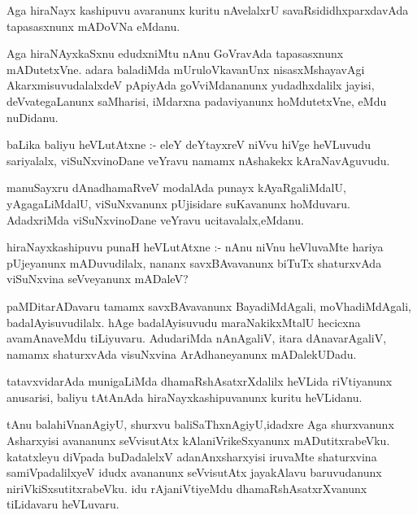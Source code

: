 \documentclass{article}
\begin{document}
\begin{mn}
Aga hiraNayx kashipuvu avaranunx kuritu nAvelalxrU savaRsididhxparxdavAda 
tapasasxnunx mADoVNa eMdanu.
\end{mn}

\begin{mn}
Aga hiraNAyxkaSxnu edudxniMtu nAnu GoVravAda tapasasxnunx mADutetxVne.
adara baladiMda mUruloVkavanUnx nisasxMshayavAgi AkarxmisuvudalalxdeV 
pApiyAda goVviMdananunx yudadhxdalilx jayisi, deVvategaLanunx saMharisi, 
iMdarxna padaviyanunx hoMdutetxVne, eMdu nuDidanu.
\end{mn}

\begin{mn}
baLika baliyu heVLutAtxne :- eleY deYtayxreV niVvu hiVge heVLuvudu sariyalalx,
 viSuNxvinoDane veYravu namamx nAshakekx kAraNavAguvudu.
\end{mn}

\begin{mn}
manuSayxru dAnadhamaRveV modalAda punayx kAyaRgaliMdalU, yAgagaLiMdalU, 
viSuNxvanunx pUjisidare suKavanunx hoMduvaru. AdadxriMda viSuNxvinoDane 
veYravu ucitavalalx,eMdanu. 
\end{mn}

\begin{mn}
hiraNayxkashipuvu punaH heVLutAtxne :- nAnu niVnu heVluvaMte hariya pUjeyanunx 
mADuvudilalx, nananx savxBAvavanunx biTuTx shaturxvAda viSuNxvina seVveyanunx mADaleV?
\end{mn}

\begin{mn}
paMDitarADavaru tamamx savxBAvavanunx BayadiMdAgali, moVhadiMdAgali, 
badalAyisuvudilalx. hAge badalAyisuvudu maraNakikxMtalU hecicxna avamAnaveMdu 
tiLiyuvaru. AdudariMda nAnAgaliV, itara dAnavarAgaliV, namamx shaturxvAda 
visuNxvina ArAdhaneyanunx mADalekUDadu.
\end{mn}

\begin{mn}
tatavxvidarAda munigaLiMda dhamaRshAsatxrXdalilx heVLida riVtiyanunx 
anusarisi, baliyu tAtAnAda hiraNayxkashipuvanunx kuritu heVLidanu. 
\end{mn}

\begin{mn}
tAnu balahiVnanAgiyU, shurxvu baliSaThxnAgiyU,idadxre Aga shurxvanunx 
Asharxyisi avananunx seVvisutAtx kAlaniVrikeSxyanunx mADutitxrabeVku. 
katatxleyu diVpada buDadalelxV adanAnxsharxyisi iruvaMte shaturxvina 
samiVpadalilxyeV idudx avananunx seVvisutAtx jayakAlavu baruvudanunx 
niriVkiSxsutitxrabeVku.  idu rAjaniVtiyeMdu dhamaRshAsatxrXvanunx tiLidavaru heVLuvaru.
\end{mn}
\end{document}
